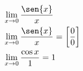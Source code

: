 \begin{ex}
\begin{align}
&\lim_{x\rightarrow 0} \frac{\sen{x}}{x}\nonumber\\
&\lim_{x\rightarrow 0} \frac{\sen{x}}{x}= \left[\frac{0}{0}\right]\nonumber\\
&\lim_{x\rightarrow 0} \frac{\cos{x}}{1}=1\nonumber
\end{align}
\end{ex}
